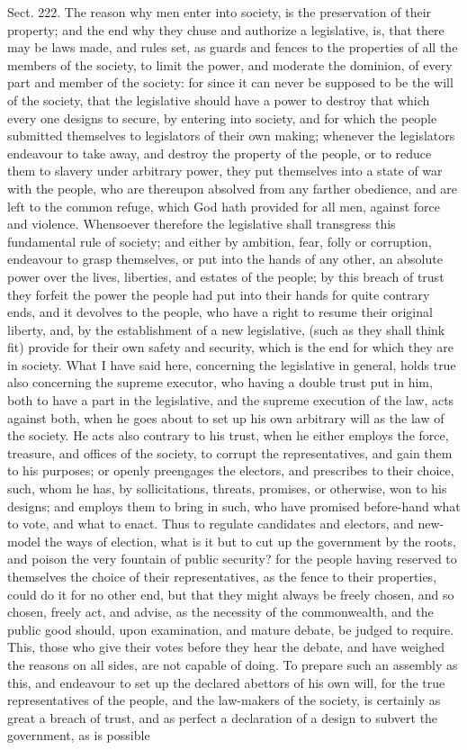 \documentclass[11pt,openany]{book}
\begin{document}
Sect. 222. The reason why men enter into society, is the preservation of their property; and the end why they chuse and authorize a legislative, is, that there may be laws made, and rules set, as guards and fences to the properties of all the members of the society, to limit the power, and moderate the dominion, of every part and member of the society: for since it can never be supposed to be the will of the society, that the legislative should have a power to destroy that which every one designs to secure, by entering into society, and for which the people submitted themselves to legislators of their own making; whenever the legislators endeavour to take away, and destroy the property of the people, or to reduce them to slavery under arbitrary power, they put themselves into a state of war with the people, who are thereupon absolved from any farther obedience, and are left to the common refuge, which God hath provided for all men, against force and violence. Whensoever therefore the legislative shall transgress this fundamental rule of society; and either by ambition, fear, folly or corruption, endeavour to grasp themselves, or put into the hands of any other, an absolute power over the lives, liberties, and estates of the people; by this breach of trust they forfeit the power the people had put into their hands for quite contrary ends, and it devolves to the people, who have a right to resume their original liberty, and, by the establishment of a new legislative, (such as they shall think fit) provide for their own safety and security, which is the end for which they are in society. What I have said here, concerning the legislative in general, holds true also concerning the supreme executor, who having a double trust put in him, both to have a part in the legislative, and the supreme execution of the law, acts against both, when he goes about to set up his own arbitrary will as the law of the society. He acts also contrary to his trust, when he either employs the force, treasure, and offices of the society, to corrupt the representatives, and gain them to his purposes; or openly preengages the electors, and prescribes to their choice, such, whom he has, by sollicitations, threats, promises, or otherwise, won to his designs; and employs them to bring in such, who have promised before-hand what to vote, and what to enact. Thus to regulate candidates and electors, and new-model the ways of election, what is it but to cut up the government by the roots, and poison the very fountain of public security? for the people having reserved to themselves the choice of their representatives, as the fence to their properties, could do it for no other end, but that they might always be freely chosen, and so chosen, freely act, and advise, as the necessity of the commonwealth, and the public good should, upon examination, and mature debate, be judged to require. This, those who give their votes before they hear the debate, and have weighed the reasons on all sides, are not capable of doing. To prepare such an assembly as this, and endeavour to set up the declared abettors of his own will, for the true representatives of the people, and the law-makers of the society, is certainly as great a breach of trust, and as perfect a declaration of a design to subvert the government, as is possible 
\end{document}

